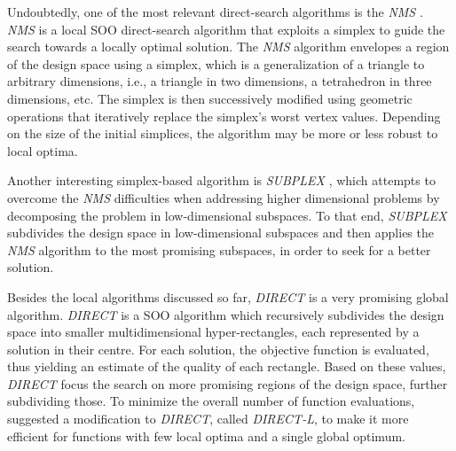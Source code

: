 Undoubtedly, one of the most relevant direct-search algorithms is the \textit{\ac{NMS}} \cite{Nelder1964}. \textit{\ac{NMS}} is a local \ac{SOO} direct-search algorithm that exploits a simplex to guide the search towards a locally optimal solution. The \textit{\ac{NMS}} algorithm envelopes a region of the design space using a simplex, which is a generalization of a triangle to arbitrary dimensions, i.e., a triangle in two dimensions, a tetrahedron in three dimensions, etc. The simplex is then successively modified using geometric operations that iteratively replace the simplex's worst vertex values. %
Depending on the size of the initial simplices, the algorithm may be more or less robust to local optima. 

Another interesting simplex-based algorithm is \textit{SUBPLEX} \cite{Rowan1990}, which attempts to overcome the \textit{\ac{NMS}} difficulties when addressing higher dimensional problems by decomposing the problem in low\nobreakdash-\hspace{0pt}dimensional
subspaces. To that end, \textit{SUBPLEX} subdivides the design space in low-dimensional subspaces and then applies the \textit{\ac{NMS}} algorithm to the most promising subspaces, in order to seek for a better solution. %

Besides the local algorithms discussed so far, \textit{\ac{DIRECT}} is a very promising global algorithm. \textit{\ac{DIRECT}} \cite{Jones1993DIRECT} is a \ac{SOO} algorithm which recursively subdivides the design space into smaller multidimensional hyper-rectangles, each represented by a solution in their centre. For each solution, the objective function is evaluated, thus yielding an estimate of the quality of each rectangle. Based on these values, \textit{\ac{DIRECT}} focus the search on more promising regions of the design space, further subdividing those. To minimize the overall number of function evaluations, \cite{Gablonsky2001} suggested a modification to \textit{\ac{DIRECT}}, called \textit{\ac{DIRECT}-L}, to make it more efficient for functions with few local optima and a single global optimum. %

